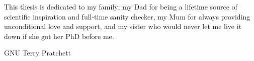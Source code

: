 \begin{dedication}
This thesis is dedicated to my family; my Dad for being a lifetime source of scientific inspiration and full-time sanity
checker, my Mum for always providing unconditional love and support, and my sister who would never let me
live it down if she got her PhD before me.

\vspace{10em}
\color{white}GNU Terry Pratchett\color{black}

\end{dedication}
